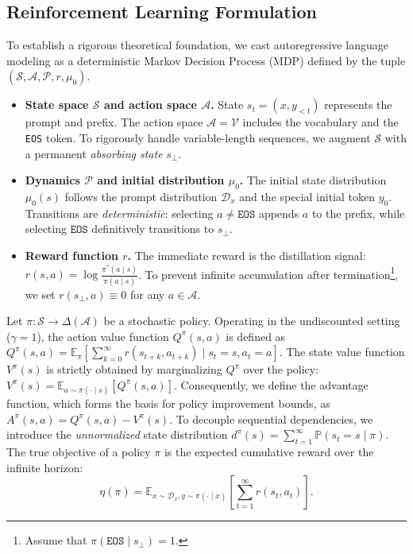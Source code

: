 \documentclass{article}
\theoremstyle{plain}
\theoremstyle{definition}
\theoremstyle{remark}
\begin{document}
\subsection{Reinforcement Learning Formulation}\label{Reinforcement Learning Formulation}
To establish a rigorous theoretical foundation, we cast autoregressive language modeling as a deterministic Markov Decision Process (MDP) defined by the tuple $\left(\mathcal{S},\mathcal{A},\mathcal{P},r,\mu_0\right)$.
\begin{itemize}
	\item \textbf{State space $\mathcal{S}$ and action space $\mathcal{A}$.} State $s_t = (x, y_{<t})$ represents the prompt and prefix. The action space $\mathcal{A} = \mathcal{V} $ includes the vocabulary and the \texttt{EOS} token. To rigorously handle variable-length sequences, we augment $\mathcal{S}$ with a permanent \textit{absorbing state} $s_\bot$.
	\item \textbf{Dynamics $\mathcal{P}$ and initial distribution $\mu_0$.} The initial state distribution $\mu_0(s)$ follows the prompt distribution $\mathcal{D}_x$ and the special initial token $y_0$. Transitions are \textit{deterministic}: selecting $a \neq \texttt{EOS}$ appends $a$ to the prefix, while selecting $\texttt{EOS}$ definitively transitions to $s_\bot$.
	\item \textbf{Reward function $r$.} The immediate reward is the distillation signal: $r(s, a) = \log \frac{\pi^*(a \mid s)}{\pi(a \mid s)}$. To prevent infinite accumulation after termination\footnote{Assume that $\pi(\texttt{EOS}\mid s_\bot)=1$.}, we set $r(s_\bot, a) \equiv 0$ for any $a\in\mathcal{A}$.
\end{itemize}

Let $\pi: \mathcal{S} \to \Delta(\mathcal{A})$ be a stochastic policy. Operating in the undiscounted setting ($\gamma=1$), the action value function $Q^\pi(s, a)$ is defined as $Q^\pi(s, a) = \mathbb{E}_{\pi} \left[ \sum_{k=0}^{\infty} r(s_{t+k}, a_{t+k})\mid s_t=s, a_t=a \right]$. The state value function $V^\pi(s)$ is strictly obtained by marginalizing $Q^\pi$ over the policy: $V^\pi(s) = \mathbb{E}_{a \sim \pi(\cdot \mid s)} \left[ Q^\pi(s, a) \right]$. Consequently, we define the advantage function, which forms the basis for policy improvement bounds, as $A^\pi(s, a) = Q^\pi(s, a) - V^\pi(s)$. To decouple sequential dependencies, we introduce the \textit{unnormalized} state distribution $d^\pi(s) = \sum_{t=1}^{\infty}\mathbb{P}(s_t = s \mid \pi)$. The true objective of a policy $\pi$ is the expected cumulative reward over the infinite horizon:
\begin{equation}\label{original eta}
	\eta(\pi) = \mathbb{E}_{x \sim \mathcal{D}_x, y \sim \pi(\cdot \mid x)} \left[ \sum_{t=1}^{\infty} r(s_t, a_t) \right].
\end{equation}
\end{document}
